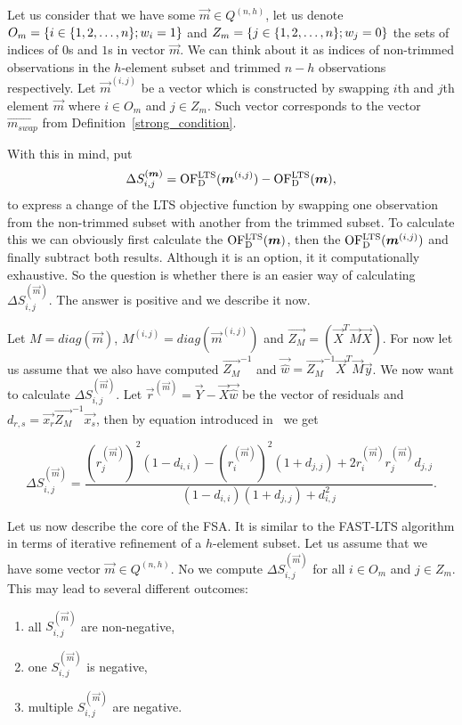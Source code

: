 Let us consider that we have some $\vec{m} \in Q^{(n,h)}$, let us denote $O_m = \{{i \in  \{{  1,2,\ldots , n  \}} ;w_i = 1\}}$ and $Z_m = \{{j \in  \{{  1,2,\ldots , n  \}} ;w_j = 0\}}$ the sets of indices of $0$s and $1$s in vector $\vec{m}$. We can think about it as indices of non-trimmed observations in the $h$-element subset and trimmed $n-h$ observations respectively. Let $\vec{m}^{(i,j)}$ be a vector which is constructed by swapping $i$th and $j$th element $\vec{m}$ where $i \in O_m$ and $j \in Z_m$. Such vector corresponds to the vector $\vec{m_{swap}}$ from Definition~\ref{strong_condition}.

With this in mind, put 
\begin{equation}
    \Delta S^{(\boldsymbol{m})}_{i,j} = \operatorname{OF^{LTS}_D}(\boldsymbol{m}^{(i,j)}) - \operatorname{OF^{LTS}_D}(\boldsymbol{m}),
\end{equation}
to express a change of the LTS objective function by swapping one observation from the non-trimmed subset with another from the trimmed subset. To calculate this we can obviously first calculate the  $\operatorname{OF^{LTS}_D}(\boldsymbol{m})$, then the $ \operatorname{OF^{LTS}_D}(\boldsymbol{m}^{(i,j)})$ and finally subtract both results. Although it is an option, it it computationally exhaustive. So the question is whether there is an easier way of calculating $\Delta S^{(\vec{m})}_{i,j}$. The answer is positive and we describe it now.

Let  
$M = diag(\vec{m})$, 
$M^{(i,j)} = diag(\vec{m}^{(i,j)})$ and 
$\vec{Z_M} = (\vec{X}^T\vec{M}\vec{X})$.
For now let us assume that we also have computed
$\vec{Z_M}^{-1}$ and $\vec{\hat{w}} = \vec{Z_M}^{-1}\vec{X}^T\vec{M}\vec{y}$.
We now want to calculate $\Delta S^{(\vec{m})}_{i,j}$.
Let 
$\vec{r}^{(\vec{m})} = \vec{Y} - \vec{X} \vec{\hat{w}} $ be the vector of residuals
and $d_{r,s} = \vec{x_r} \vec{Z_M}^{-1}  \vec{x_s} $,
then by equation introduced in~\cite{atkinson1991simulated} we get

\begin{equation} \label{hawkins:rovnice}
    \Delta S^{(\vec{m})}_{i,j} = 
    \frac{({r}^{(\vec{m})}_{j})^2(1-d_{i,i})- ({r}^{(\vec{m})}_{i})^2(1+d_{j,j}) + 2{r}^{(\vec{m})}_{i}{r}^{(\vec{m})}_{j}d_{j,j}}
    {(1-d_{i,i})(1+d_{j,j}) + d_{i,j}^2}.
\end{equation}

Let us now describe the core of the FSA. It is similar to the FAST-LTS algorithm in terms of iterative refinement of a $h$-element subset. Let us assume that we have some vector  $\vec{m} \in Q^{(n,h)}$. No we compute  $\Delta S^{(\vec{m})}_{i,j}$ for all $i \in O_m$ and $j \in Z_m$. This may lead to several different outcomes:
\begin{enumerate}
    \item all $S^{(\vec{m})}_{i,j}$ are non-negative,
    \item one $S^{(\vec{m})}_{i,j}$ is negative,
    \item multiple $S^{(\vec{m})}_{i,j}$ are negative.
\end{enumerate}

